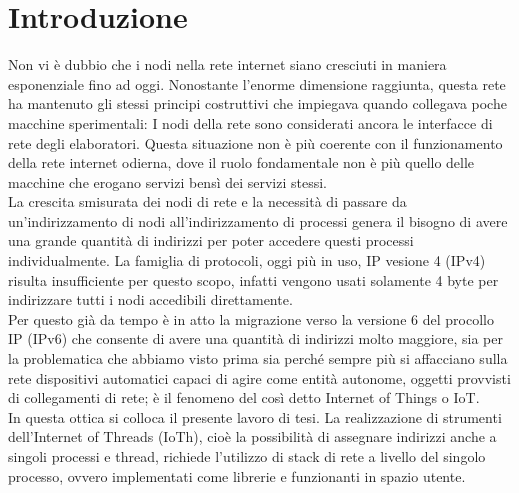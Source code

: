 

\chapter*{Introduzione}                 %


Non vi \`e dubbio che i nodi nella rete internet siano cresciuti in maniera esponenziale fino ad oggi. Nonostante l'enorme dimensione raggiunta, questa rete ha mantenuto gli stessi principi costruttivi che impiegava quando collegava poche macchine sperimentali: I nodi della rete sono considerati ancora le interfacce di rete degli elaboratori. Questa situazione non \`e pi\`u coerente con il funzionamento della rete internet odierna, dove il ruolo fondamentale non \`e pi\`u quello delle macchine che erogano servizi bens\`i dei servizi stessi.\\
La crescita smisurata dei nodi di rete e la necessit\`a di passare da un'indirizzamento di nodi all'indirizzamento di processi genera il bisogno di avere una grande quantit\`a di indirizzi per poter accedere questi processi individualmente. La famiglia di protocoli, oggi pi\`u in uso, IP vesione 4 (IPv4) risulta insufficiente per questo scopo, infatti vengono usati solamente 4 byte per indirizzare tutti i nodi accedibili direttamente.\\
Per questo gi\`a da tempo \`e in atto la migrazione verso la versione 6 del procollo IP (IPv6) che consente di avere una quantit\`a di indirizzi molto maggiore, sia per la problematica che abbiamo visto prima sia perch\'e sempre pi\`u si affacciano sulla rete dispositivi automatici capaci di agire come entit\`a autonome, oggetti provvisti di collegamenti di rete; \`e il fenomeno del cos\`i detto Internet of Things o IoT.\\
In questa ottica si colloca il presente lavoro di tesi. La realizzazione di strumenti dell'Internet of Threads (IoTh), cio\`e la possibilit\`a di assegnare indirizzi anche a singoli processi e thread, richiede l'utilizzo di stack di rete a livello del singolo processo, ovvero implementati come librerie e funzionanti in spazio utente.\\
